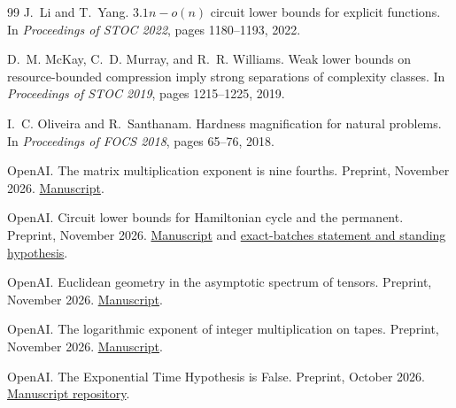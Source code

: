 \documentclass[11pt]{article}
\theoremstyle{definition}
\theoremstyle{remark}
\begin{document}
\begin{thebibliography}{99}
J.~Li and T.~Yang. $3.1n-o(n)$ circuit lower bounds for explicit functions.
In \emph{Proceedings of STOC 2022}, pages 1180--1193, 2022.

D.~M. McKay, C.~D. Murray, and R.~R. Williams. Weak lower bounds on
resource-bounded compression imply strong separations of complexity
classes. In \emph{Proceedings of STOC 2019}, pages 1215--1225, 2019.

I.~C. Oliveira and R.~Santhanam. Hardness magnification for natural
problems. In \emph{Proceedings of FOCS 2018}, pages 65--76, 2018.

OpenAI. The matrix multiplication exponent is nine fourths.
Preprint, November 2026.
\href{https://github.com/openai/math/blob/3344da59991ed94f9ba711217b29c1d760badfa6/preprints/The-matrix-multiplication-exponent-is-nine-fourths-November-24-2026/paper.pdf}{Manuscript}.

OpenAI. Circuit lower bounds for Hamiltonian cycle and the permanent.
Preprint, November 2026.
\href{https://github.com/openai/math/blob/3344da59991ed94f9ba711217b29c1d760badfa6/preprints/Circuit-lower-bounds-for-Hamiltonian-cycle-and-the-permanent-November-24-2026/paper.pdf}{Manuscript}
and \href{https://github.com/openai/math/blob/3344da59991ed94f9ba711217b29c1d760badfa6/preprints/Circuit-lower-bounds-for-Hamiltonian-cycle-and-the-permanent-November-24-2026/build/model.tex}{exact-batches statement and standing hypothesis}.

OpenAI. Euclidean geometry in the asymptotic spectrum of tensors.
Preprint, November 2026.
\href{https://github.com/openai/math/blob/3344da59991ed94f9ba711217b29c1d760badfa6/preprints/Euclidean-geometry-in-the-asymptotic-spectrum-of-tensors-November-24-2026/paper.pdf}{Manuscript}.

OpenAI. The logarithmic exponent of integer multiplication on tapes.
Preprint, November 2026.
\href{https://github.com/openai/math/blob/3344da59991ed94f9ba711217b29c1d760badfa6/preprints/The-logarithmic-exponent-of-integer-multiplication-on-tapes-November-24-2026/paper.pdf}{Manuscript}.

OpenAI. The Exponential Time Hypothesis is False.
Preprint, October 2026.
\href{https://github.com/openai/math/tree/3344da59991ed94f9ba711217b29c1d760badfa6/preprints/The-Exponential-Time-Hypothesis-is-False-October-25-2026}{Manuscript repository}.
\end{thebibliography}
\end{document}
